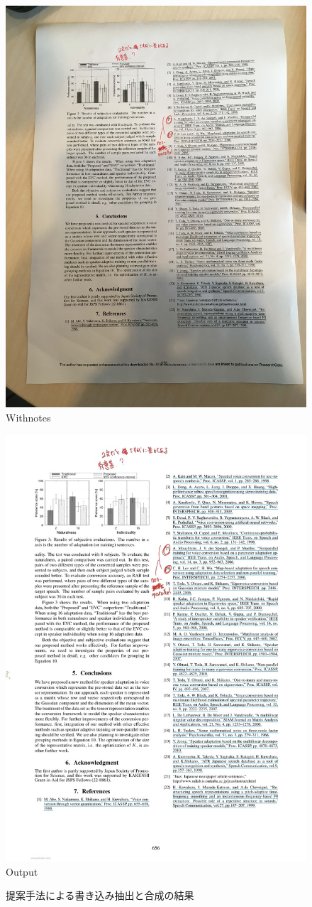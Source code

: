 \documentclass[a4paper, dvipdfmx]{jarticle}
\begin{document}
\begin{figure}[t]
\begin{minipage}{0.5\linewidth}
        \includegraphics[clip, width=0.8\linewidth]{fig/withnotes.jpg}
        {\footnotesize Withnotes}
    \end{minipage}%
    \begin{minipage}{0.5\columnwidth}
        \centering
        \includegraphics[clip, width=0.8\linewidth]{fig/output.jpg}
        {\footnotesize Output}
    \end{minipage}
    \caption{提案手法による書き込み抽出と合成の結果}
    \label{fig:results}
\end{figure}
\end{document}
